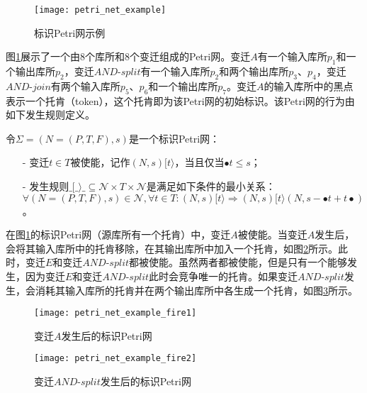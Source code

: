 \begin{figure}[htbp]
  \centering
  \texttt{[image: petri\_net\_example]}
  \caption{标识Petri网示例\label{fig:petri_net_example}}
\end{figure}

图\ref{fig:petri_net_example}展示了一个由8个库所和8个变迁组成的Petri网。变迁$A$有一个输入库所$p_{1}$和一个输出库所$p_{2}$，变迁$AND$-$split$有一个输入库所$p_{2}$和两个输出库所$p_{3}$、$p_{4}$，变迁$AND$-$join$有两个输入库所$p_{5}$、$p_{6}$和一个输出库所$p_{7}$。变迁$A$的输入库所中的黑点表示一个托肯（token），这个托肯即为该Petri网的初始标识。该Petri网的行为由如下发生规则定义。

\begin{definition}[发生规则]\label{def:firing_rule}
令$\Sigma=(N=(P,T,F),s)$是一个标识Petri网：
  \begin{itemize}
  	\item[-] 变迁$t\in T$被使能，记作$(N,s)[t\rangle$，当且仅当$\bullet t\leq s$；
  	\item[-] 发生规则$\_[\_\rangle\_\subseteq\mathcal{N}\times T\times\mathcal{N}$是满足如下条件的最小关系：\\$\forall (N=(P,T,F),s)\in\mathcal{N},\forall t\in T:(N,s)[t\rangle\Rightarrow(N,s)[t\rangle(N,s-\bullet t+t\bullet)$。
  \end{itemize}
\end{definition}

在图\ref{fig:petri_net_example}的标识Petri网（源库所有一个托肯）中，变迁$A$被使能。当变迁$A$发生后，会将其输入库所中的托肯移除，在其输出库所中加入一个托肯，如图\ref{fig:petri_net_example_fire1}所示。此时，变迁$E$和变迁$AND$-$split$都被使能。虽然两者都被使能，但是只有一个能够发生，因为变迁$E$和变迁$AND$-$split$此时会竞争唯一的托肯。如果变迁$AND$-$split$发生，会消耗其输入库所的托肯并在两个输出库所中各生成一个托肯，如图\ref{fig:petri_net_example_fire2}所示。

\begin{figure}[htbp]
  \centering
  \texttt{[image: petri\_net\_example\_fire1]}
  \caption{变迁$A$发生后的标识Petri网\label{fig:petri_net_example_fire1}}
\end{figure}

\begin{figure}[htbp]
  \centering
  \texttt{[image: petri\_net\_example\_fire2]}
  \caption{变迁$AND$-$split$发生后的标识Petri网\label{fig:petri_net_example_fire2}}
\end{figure}

